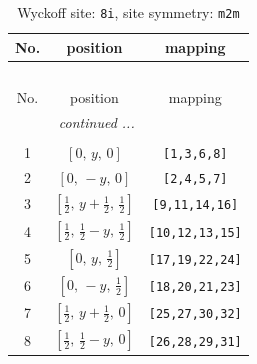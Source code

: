 \documentclass[fleqn,8pt]{jsarticle}
\begin{document}
\begin{longtable}{ccc}
\caption{Wyckoff site: {\tt 8i}, site symmetry: {\tt m2m}}
 \\
 \hline \hline
No. & position & mapping \\ \hline \endfirsthead

\multicolumn{2}{l}{\tablename\ \thetable{}} \\
 \hline \hline
No. & position & mapping \\ \hline \endhead

 \hline \hline
\multicolumn{2}{r}{\footnotesize\it continued ...} \\ \endfoot

 \hline \hline
\multicolumn{2}{r}{} \\ \endlastfoot

1 & $\left[ 0,\, y,\, 0 \right]$ & {\tt [1,3,6,8]} \\ \hline
2 & $\left[ 0,\, - y,\, 0 \right]$ & {\tt [2,4,5,7]} \\ \hline
3 & $\left[ \frac{1}{2},\, y + \frac{1}{2},\, \frac{1}{2} \right]$ & {\tt [9,11,14,16]} \\ \hline
4 & $\left[ \frac{1}{2},\, \frac{1}{2} - y,\, \frac{1}{2} \right]$ & {\tt [10,12,13,15]} \\ \hline
5 & $\left[ 0,\, y,\, \frac{1}{2} \right]$ & {\tt [17,19,22,24]} \\ \hline
6 & $\left[ 0,\, - y,\, \frac{1}{2} \right]$ & {\tt [18,20,21,23]} \\ \hline
7 & $\left[ \frac{1}{2},\, y + \frac{1}{2},\, 0 \right]$ & {\tt [25,27,30,32]} \\ \hline
8 & $\left[ \frac{1}{2},\, \frac{1}{2} - y,\, 0 \right]$ & {\tt [26,28,29,31]} \\
\end{longtable}
\renewcommand{\arraystretch}{1.2}
\end{document}
